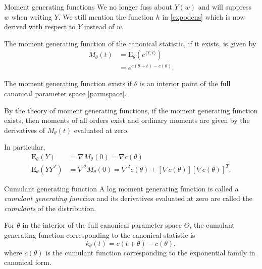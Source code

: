 \documentclass[
  ignorenonframetext,
]{beamer}
\begin{document}
\begin{frame}{Moment generating functions}
\protect\hypertarget{moment-generating-functions}{}
We no longer fuss about \(Y(w)\) and will suppress \(w\) when writing
\(Y\). We still mention the function \(h\) in \eqref{expodens} which is
now derived with respect to \(Y\) instead of \(w\).

The moment generating function of the canonical statistic, if it exists,
is given by \begin{equation} \label{mgf}
\begin{split}
    M_\theta(t) &= \text{E}_\theta\left(e^{\langle Y, t\rangle}\right) \\
      &= e^{c(\theta + t) - c(\theta)}.
\end{split}
\end{equation}

The moment generating function exists if \(\theta\) is an interior point
of the full canonical parameter space \eqref{parmspace}.
\end{frame}

\begin{frame}{}
\protect\hypertarget{section-1}{}
By the theory of moment generating functions, if the moment generating
function exists, then moments of all orders exist and ordinary moments
are given by the derivatives of \(M_\theta(t)\) evaluated at zero.

In particular, \begin{align*}
  \text{E}_\theta(Y) &= \nabla M_\theta(0) = \nabla c(\theta) \\  
  \text{E}_\theta(YY^T) &= \nabla^2 M_\theta(0) = \nabla^2 c(\theta) + [\nabla c(\theta)][\nabla c(\theta)]^T.      
\end{align*}
\end{frame}

\begin{frame}{Cumulant generating function}
\protect\hypertarget{cumulant-generating-function}{}
A log moment generating function is called a
\emph{cumulant generating function} and its derivatives evaluated at
zero are called the \emph{cumulants} of the distribution.

For \(\theta\) in the interior of the full canonical parameter space
\(\Theta\), the cumulant generating function corresponding to the
canonical statistic is \begin{equation} \label{cgf}
  k_\theta(t) = c(t + \theta) - c(\theta),  
\end{equation} where \(c(\theta)\) is the cumulant function
corresponding to the exponential family in canonical form.
\end{frame}
\end{document}
